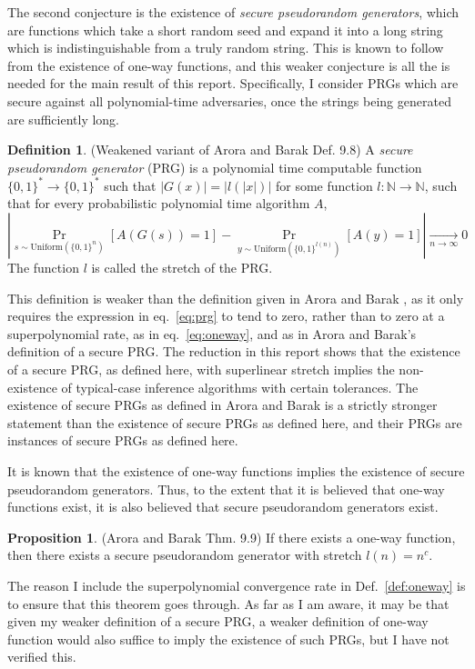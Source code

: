 \documentclass{article}
\theoremstyle{definition}
\newtheorem{defn}{Definition}
\newtheorem{prop}[thm]{Proposition}
\theoremstyle{remark}
\begin{document}
The second conjecture is the existence of \textit{secure pseudorandom generators}, which are functions which take a short random seed and expand it into a long string which is indistinguishable from a truly random string.
This is known to follow from the existence of one-way functions, and this weaker conjecture is all the is needed for the main result of this report.
Specifically, I consider PRGs which are secure against all polynomial-time adversaries, once the strings being generated are sufficiently long.

\begin{defn}{(Weakened variant of Arora and Barak Def. 9.8)}
A \textit{secure pseudorandom generator} (PRG) is a polynomial time computable function $\{0, 1\}^* \to \{0, 1\}^*$ such that $|G(x)| = |l(|x|)|$ for some function $l : \mathbb{N} \to \mathbb{N}$, such that for every probabilistic polynomial time algorithm $A$,
\begin{equation} \label{eq:prg}
|\Pr_{s \sim \text{Uniform}(\{0, 1\}^n)}[A(G(s)) = 1] - \Pr_{y \sim \text{Uniform}(\{0, 1\}^{l(n)})}[A(y) = 1]| \underset{n \to \infty}{\to} 0
\end{equation}
The function $l$ is called the stretch of the PRG.
\end{defn}
This definition is weaker than the definition given in Arora and Barak \cite{arora2009computational}, as it only requires the expression in eq.~\ref{eq:prg} to tend to zero, rather than to zero at a superpolynomial rate, as in eq.~\ref{eq:oneway}, and as in Arora and Barak's definition of a secure PRG.
The reduction in this report shows that the existence of a secure PRG, as defined here, with superlinear stretch implies the non-existence of typical-case inference algorithms with certain tolerances.
The existence of secure PRGs as defined in Arora and Barak is a strictly stronger statement than the existence of secure PRGs as defined here, and their PRGs are instances of secure PRGs as defined here.

It is known that the existence of one-way functions implies the existence of secure pseudorandom generators.
Thus, to the extent that it is believed that one-way functions exist, it is also believed that secure pseudorandom generators exist.
\begin{prop}{(Arora and Barak Thm. 9.9)} \label{prop:oneway_to_prg}
If there exists a one-way function, then there exists a secure pseudorandom generator with stretch $l(n) = n^c$.
\end{prop}
The reason I include the superpolynomial convergence rate in Def.~\ref{def:oneway} is to ensure that this theorem goes through.
As far as I am aware, it may be that given my weaker definition of a secure PRG, a weaker definition of one-way function would also suffice to imply the existence of such PRGs, but I have not verified this.
\end{document}
